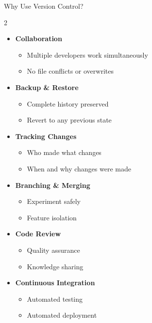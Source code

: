 \documentclass[aspectratio=169]{beamer}
\begin{document}
	\begin{frame}{Why Use Version Control?}
		\begin{multicols}{2}
			\begin{itemize}
				\item \textbf{Collaboration}
				\begin{itemize}
					\item Multiple developers work simultaneously
					\item No file conflicts or overwrites
				\end{itemize}
				\vspace{0.3cm}
				\item \textbf{Backup \& Restore}
				\begin{itemize}
					\item Complete history preserved
					\item Revert to any previous state
				\end{itemize}
				\vspace{0.3cm}
				\item \textbf{Tracking Changes}
				\begin{itemize}
					\item Who made what changes
					\item When and why changes were made
				\end{itemize}
			\end{itemize}
			
			\columnbreak
			
			\begin{itemize}
				\item \textbf{Branching \& Merging}
				\begin{itemize}
					\item Experiment safely
					\item Feature isolation
				\end{itemize}
				\vspace{0.3cm}
				\item \textbf{Code Review}
				\begin{itemize}
					\item Quality assurance
					\item Knowledge sharing
				\end{itemize}
				\vspace{0.3cm}
				\item \textbf{Continuous Integration}
				\begin{itemize}
					\item Automated testing
					\item Automated deployment
				\end{itemize}
			\end{itemize}
		\end{multicols}
	\end{frame}
	
\end{document}
